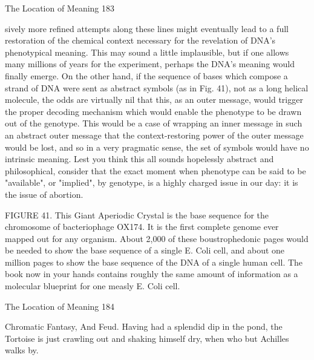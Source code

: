 The Location of Meaning                                                                  183

sively more refined attempts along these lines might eventually lead to a full restoration
of the chemical context necessary for the revelation of DNA's phenotypical meaning.
This may sound a little implausible, but if one allows many millions of years for the
experiment, perhaps the DNA's meaning would finally emerge.
        On the other hand, if the sequence of bases which compose a strand of DNA were
sent as abstract symbols (as in Fig. 41), not as a long helical molecule, the odds are
virtually nil that this, as an outer message, would trigger the proper decoding mechanism
which would enable the phenotype to be drawn out of the genotype. This would be a case
of wrapping an inner message in such an abstract outer message that the context-restoring
power of the outer message would be lost, and so in a very pragmatic sense, the set of
symbols would have no intrinsic meaning. Lest you think this all sounds hopelessly
abstract and philosophical, consider that the exact moment when phenotype can be said to
be "available", or "implied", by genotype, is a highly charged issue in our day: it is the
issue of abortion.

FIGURE 41. This Giant Aperiodic Crystal is the base sequence for the chromosome of
bacteriophage OX174. It is the first complete genome ever mapped out for any organism.
About 2,000 of these boustrophedonic pages would be needed to show the base sequence
of a single E. Coli cell, and about one million pages to show the base sequence of the
DNA of a single human cell. The book now in your hands contains roughly the same
amount of information as a molecular blueprint for one measly E. Coli cell.




The Location of Meaning                                                               184

                  Chromatic Fantasy, And Feud.
       Having had a splendid dip in the pond, the Tortoise is just crawling out and
                 shaking himself dry, when who but Achilles walks by.

